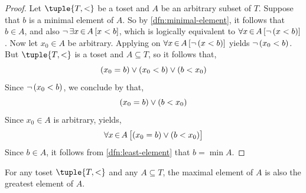 \begin{proof}
    Let \( \tuple{T, <} \) be a toset and \( A \) be an arbitrary subset of \( T \). Suppose that \( b \) is a minimal element of \( A \).
    So by \cref{dfn:minimal-element}, it follows that \( b \in A \), and also \( \lnot \, \exists x\,{\in}\,A \, \mleft[ x < b \mright] \), which is
    logically equivalent to \( \forall x\,{\in}\,A \, \mleft[ \lnot \, \mleft( x < b \mright) \mright] \). Now let \( x_{0} \in A \) be arbitrary.
    Applying  on \( \forall x\,{\in}\,A \, \mleft[ \lnot \, \mleft( x < b \mright) \mright] \) yields \( \lnot \, \mleft( x_{0} < b \mright) \).
    But \( \tuple{T, <} \) is a toset and \( A \subseteq T \), so it follows that,
    \begin{equation*}
        \mleft(x_{0} = b\mright) \lor \mleft(x_{0} < b\mright) \lor \mleft(b < x_{0}\mright)
    \end{equation*}
    Since \( \lnot \, \mleft( x_{0} < b \mright) \), we conclude by  that,
    \begin{equation*}
        \mleft( x_{0} = b \mright) \lor \mleft( b < x_{0} \mright)
    \end{equation*}
    Since \( x_{0} \in A \) is arbitrary,  yields,
    \begin{equation*}
        \forall x\,{\in}\,A \, \big[ \mleft( x_{0} = b \mright) \lor \mleft( b < x_{0} \mright) \big]
    \end{equation*}
    Since \( b \in A \), it follows from \cref{dfn:least-element} that \( b = \min A \).
\end{proof}

\begin{thm}
    \label{thm:maximal-element-is-the-greatest-element-for-tosets}
    For any toset \( \tuple{T,<} \) and any \( A \subseteq T \), the maximal element of \( A \) is also
    the greatest element of \( A \).
\end{thm}

